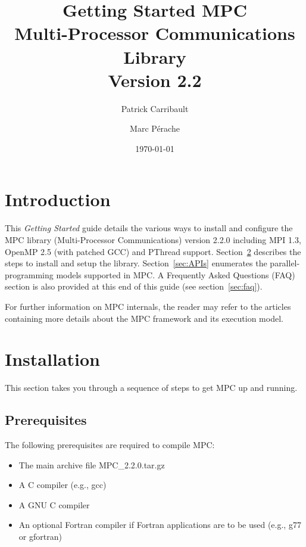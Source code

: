 \documentclass[a4paper,11pt]{article}
\title{Getting Started MPC\\Multi-Processor Communications Library\\Version 2.2}
\author{Patrick Carribault \and Marc P\'{e}rache}
\date{\today}
\def\MPCVERSION{2.2.0}
\begin{document}
\maketitle
\tableofcontents

\section{Introduction}
This \textit{Getting Started} guide details the various ways to install and configure the MPC library
(Multi-Processor Communications) version {\MPCVERSION} including MPI 1.3, OpenMP 2.5 (with patched GCC) and PThread support.
Section~\ref{sec:installation} describes the steps to install and setup the library.
Section~\ref{sec:APIs} enumerates the parallel-programming models supported in MPC.
A Frequently Asked Questions (FAQ) section is also provided at this end of this guide (see section~\ref{sec:faq}).

For further information on MPC internals, the reader may refer to the
articles~\cite{Perache08,Perache09,Carribault10} containing more details about the MPC
framework and its execution model.

\section{Installation}
\label{sec:installation}

This section takes you through a sequence of steps to get MPC up and running.

\subsection{Prerequisites}

The following prerequisites are required to compile MPC:
\begin{itemize}
    \item  The main archive file MPC\_\MPCVERSION.tar.gz

    \item  A C compiler (e.g., gcc)

    \item  A GNU C compiler

    \item  An optional Fortran compiler if Fortran applications are to be used
      (e.g., g77 or gfortran)
\end{itemize}
\end{document}
